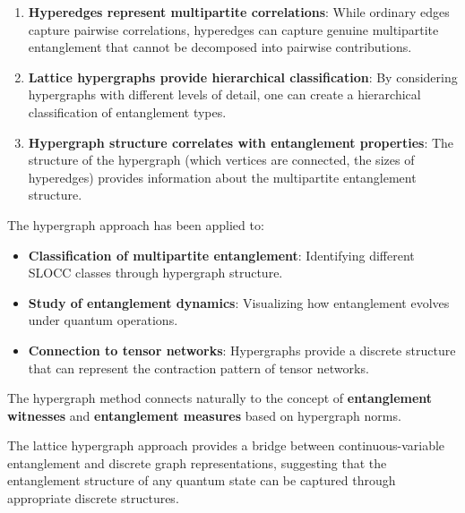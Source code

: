\documentclass[%
 amsmath,amssymb,
 aps,
rmp,
]{revtex4-2}
\begin{document}
\begin{enumerate}
	\item \textbf{Hyperedges represent multipartite correlations}: While ordinary edges capture pairwise correlations, hyperedges can capture genuine multipartite entanglement that cannot be decomposed into pairwise contributions.

	\item \textbf{Lattice hypergraphs provide hierarchical classification}: By considering hypergraphs with different levels of detail, one can create a hierarchical classification of entanglement types.

	\item \textbf{Hypergraph structure correlates with entanglement properties}: The structure of the hypergraph (which vertices are connected, the sizes of hyperedges) provides information about the multipartite entanglement structure.
\end{enumerate}

The hypergraph approach has been applied to:
\begin{itemize}
	\item \textbf{Classification of multipartite entanglement}: Identifying different SLOCC classes through hypergraph structure.
	\item \textbf{Study of entanglement dynamics}: Visualizing how entanglement evolves under quantum operations.
	\item \textbf{Connection to tensor networks}: Hypergraphs provide a discrete structure that can represent the contraction pattern of tensor networks.
\end{itemize}

The hypergraph method connects naturally to the concept of \textbf{entanglement witnesses} and \textbf{entanglement measures} based on hypergraph norms.

The lattice hypergraph approach provides a bridge between continuous-variable entanglement and discrete graph representations, suggesting that the entanglement structure of any quantum state can be captured through appropriate discrete structures.







\end{document}
